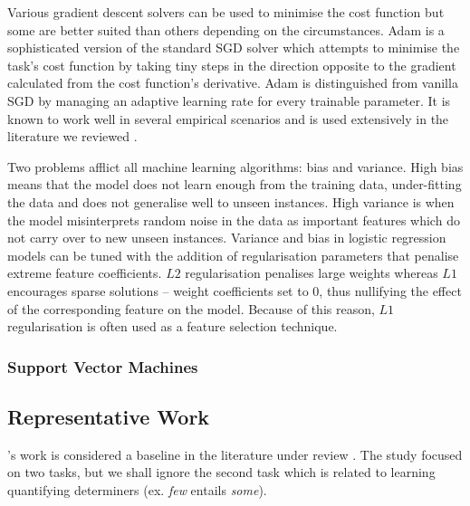 Various gradient descent solvers can be used to minimise the cost function but some are better suited than others depending on the circumstances.  Adam \citep{kingma2014adam} is a sophisticated version of the standard \ac{SGD} solver which attempts to minimise the task’s cost function by taking tiny steps in the direction opposite to the gradient calculated from the cost function’s derivative.  Adam is distinguished from vanilla \ac{SGD} by managing an adaptive learning rate for every trainable parameter.  It is known to work well in several empirical scenarios and is used extensively in the literature we reviewed \citep{shwartz2016path, bernier2018crim, yamane2016distributional, espinosa2016supervised}.

Two problems afflict all machine learning algorithms: bias and variance.  High bias means that the model does not learn enough from the training data, under-fitting the data and does not generalise well to unseen instances.   High variance is when the model misinterprets random noise in the data as important features which do not carry over to new unseen instances.  Variance and bias in logistic regression models can be tuned with the addition of regularisation parameters that penalise extreme feature coefficients. $L2$ regularisation penalises large weights whereas $L1$ encourages sparse solutions – weight coefficients set to $0$, thus nullifying the effect of the corresponding feature on the model.  Because of this reason, $L1$ regularisation is often used as a feature selection technique.

\subsubsection{Support Vector Machines}

\subsection{Representative Work} 
\citeauthor{baroni2012entailment}'s work \citep{baroni2012entailment} is considered a baseline in the literature under review \citep{shwartz2017siege, shwartz2016path, camacho2017we, roller2014inclusive, levy2015supervised}.  The study focused on two tasks, but we shall ignore the second task which is related to learning quantifying determiners (ex. \textit{few} entails \textit{some}).  

